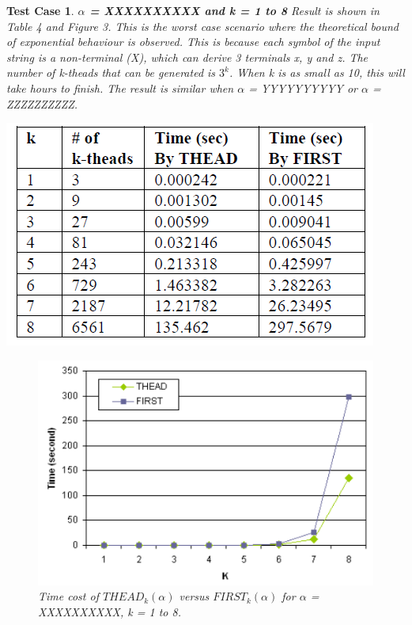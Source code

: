 \documentclass{sig-alternate-05-2015}
\newtheorem{TestCase}{Test Case}
\begin{document}
\begin{TestCase}
\textbf{$\alpha$ = XXXXXXXXXX and k = 1 to 8}
Result is shown in Table 4 and Figure 3. This is the worst
case scenario where the theoretical bound of exponential
behaviour is observed. This is because each symbol of the
input string is a non-terminal (X), which can derive 3 terminals
x, y and z. The number of k-theads that can be generated
is $3^k$. When k is as small as 10, this will take hours to
finish. The result is similar when $\alpha$ = YYYYYYYYYY or
$\alpha$ = ZZZZZZZZZZ.

\begin{table}[h]
\centering
\includegraphics[scale=0.5]{table4.PNG}
\caption{Number of generated k-theads and time spent on
input string XXXXXXXXXX, for k = 1 to 8}
\label{table:4}
\end{table}

\begin{figure}[h]
\centering
\includegraphics[scale=0.5]{figure3.PNG}
\caption{Time cost of $THEAD_k(\alpha)$ versus $FIRST_k(\alpha)$
for $\alpha$ = XXXXXXXXXX, k = 1 to 8.}
\label{fig:3}
\end{figure}
\end{TestCase}
\end{document}

